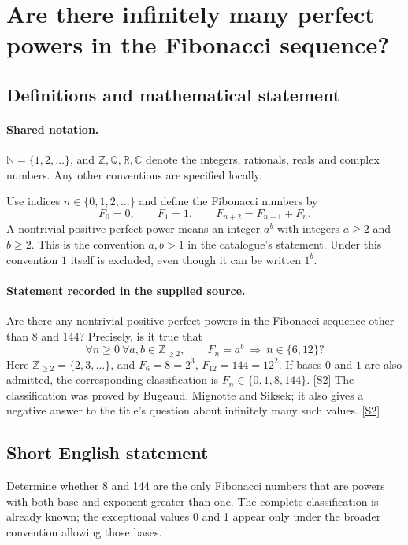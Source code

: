 \documentclass[11pt]{article}
\newcommand{\sref}[2]{\hyperlink{source:#1:#2}{[S#2]}}
\begin{document}
\section{Are there infinitely many perfect powers in the Fibonacci sequence?}\label{statement}

\subsection{Definitions and mathematical statement}

\paragraph{Shared notation.}$\mathbb N=\{1,2,\ldots\}$, and $\mathbb Z,\mathbb Q,\mathbb R,\mathbb C$ denote the integers, rationals, reals and complex numbers. Any other conventions are specified locally.


Use indices $n\in\{0,1,2,\ldots\}$ and define the Fibonacci numbers by
\[
 F_0=0,\qquad F_1=1,\qquad F_{n+2}=F_{n+1}+F_n.
\]
A nontrivial positive perfect power means an integer $a^b$ with integers $a\ge2$ and $b\ge2$. This is the convention $a,b>1$ in the catalogue's statement. Under this convention $1$ itself is excluded, even though it can be written $1^b$.
\paragraph{Statement recorded in the supplied source.}
Are there any nontrivial positive perfect powers in the Fibonacci sequence other than $8$ and $144$? Precisely, is it true that
\[
 \forall n\ge0\ \forall a,b\in\mathbb Z_{\ge2},\qquad
 F_n=a^b\ \Longrightarrow\ n\in\{6,12\}?
\]
Here $\mathbb Z_{\ge2}=\{2,3,\ldots\}$, and $F_6=8=2^3$, $F_{12}=144=12^2$. If bases $0$ and $1$ are also admitted, the corresponding classification is $F_n\in\{0,1,8,144\}$. \sref{statement}{2}
The classification was proved by Bugeaud, Mignotte and Siksek; it also gives a negative answer to the title's question about infinitely many such values. \sref{statement}{2}
\subsection{Short English statement}
Determine whether 8 and 144 are the only Fibonacci numbers that are powers with both base and exponent greater than one. The complete classification is already known; the exceptional values 0 and 1 appear only under the broader convention allowing those bases.
\end{document}
